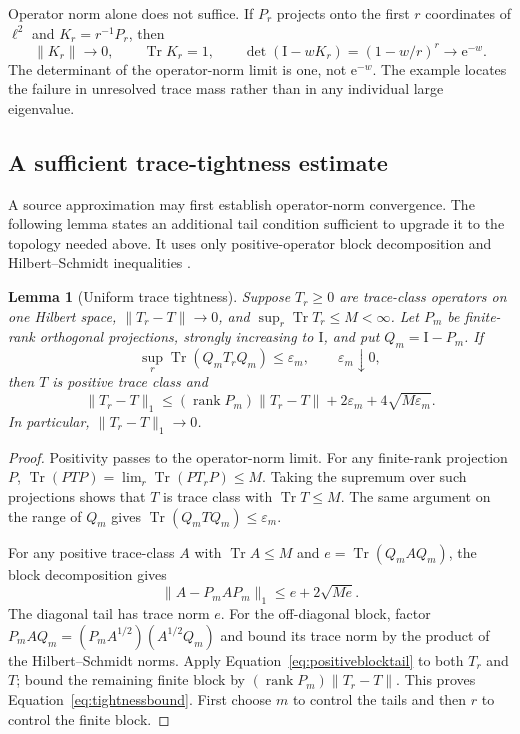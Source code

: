 \documentclass[11pt,letterpaper]{article}
\numberwithin{equation}{section}
\newtheorem{lemma}[theorem]{Lemma}
\theoremstyle{definition}
\theoremstyle{remark}
\newcommand{\Id}{\mathrm I}
\newcommand{\e}{\mathrm e}
\DeclareMathOperator{\Tr}{Tr}
\DeclareMathOperator{\rank}{rank}
\begin{document}
Operator norm alone does not suffice. If $P_r$ projects onto the first $r$ coordinates of $\ell^2$ and $K_r=r^{-1}P_r$, then
\begin{equation}
 \|K_r\|\to0,\qquad \Tr K_r=1,
 \qquad \det(\Id-wK_r)=(1-w/r)^r\longrightarrow\e^{-w}.
 \label{eq:escapingtrace}
\end{equation}
The determinant of the operator-norm limit is one, not $\e^{-w}$. The example locates the failure in unresolved trace mass rather than in any individual large eigenvalue.

\subsection{A sufficient trace-tightness estimate}
\label{subsec:tracetightness}
A source approximation may first establish operator-norm convergence. The following lemma states an additional tail condition sufficient to upgrade it to the topology needed above. It uses only positive-operator block decomposition and Hilbert--Schmidt inequalities \cite{simon}.

\begin{lemma}[Uniform trace tightness]
\label{lem:tracetightness}
Suppose $T_r\geq0$ are trace-class operators on one Hilbert space, $\|T_r-T\|\to0$, and $\sup_r\Tr T_r\leq M<\infty$. Let $P_m$ be finite-rank orthogonal projections, strongly increasing to $\Id$, and put $Q_m=\Id-P_m$. If
\begin{equation}
 \sup_r\Tr(Q_mT_rQ_m)\leq\varepsilon_m,
 \qquad\varepsilon_m\downarrow0,
 \label{eq:tightnesstail}
\end{equation}
then $T$ is positive trace class and
\begin{equation}
 \|T_r-T\|_1
 \leq(\rank P_m)\|T_r-T\|
       +2\varepsilon_m+4\sqrt{M\varepsilon_m}.
 \label{eq:tightnessbound}
\end{equation}
In particular, $\|T_r-T\|_1\to0$.
\end{lemma}
\begin{proof}
Positivity passes to the operator-norm limit. For any finite-rank projection $P$, $\Tr(PTP)=\lim_r\Tr(PT_rP)\leq M$. Taking the supremum over such projections shows that $T$ is trace class with $\Tr T\leq M$. The same argument on the range of $Q_m$ gives $\Tr(Q_mTQ_m)\leq\varepsilon_m$.

For any positive trace-class $A$ with $\Tr A\leq M$ and $e=\Tr(Q_mAQ_m)$, the block decomposition gives
\begin{equation}
 \|A-P_mAP_m\|_1\leq e+2\sqrt{Me}.
 \label{eq:positiveblocktail}
\end{equation}
The diagonal tail has trace norm $e$. For the off-diagonal block, factor $P_mAQ_m=(P_mA^{1/2})(A^{1/2}Q_m)$ and bound its trace norm by the product of the Hilbert--Schmidt norms. Apply Equation~\eqref{eq:positiveblocktail} to both $T_r$ and $T$; bound the remaining finite block by $(\rank P_m)\|T_r-T\|$. This proves Equation~\eqref{eq:tightnessbound}. First choose $m$ to control the tails and then $r$ to control the finite block.
\end{proof}
\end{document}
